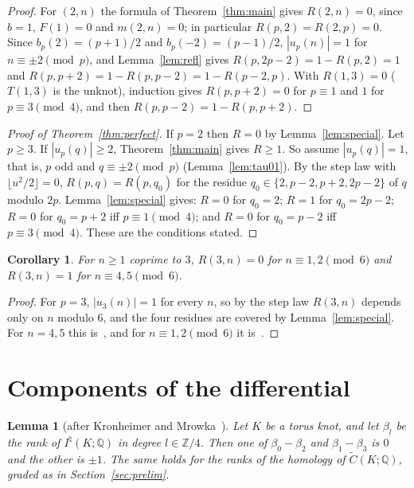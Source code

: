 \documentclass[11pt,reqno]{amsart}
\theoremstyle{plain}
\newtheorem{lemma}[theorem]{Lemma}
\newtheorem{corollary}[theorem]{Corollary}
\theoremstyle{definition}
\newcommand{\Z}{\mathbb{Z}}
\newcommand{\Q}{\mathbb{Q}}
\newcommand{\Inat}{I^{\natural}}
\newcommand{\tC}{\widetilde C}
\begin{document}
\begin{proof}
For $(2,n)$ the formula of Theorem~\ref{thm:main} gives $R(2,n)=0$, since $b=1$, $F(1)=0$ and
$m(2,n)=0$; in particular $R(p,2)=R(2,p)=0$. Since $b_p(2)=(p+1)/2$ and $b_p(-2)=(p-1)/2$,
$|u_p(n)|=1$ for $n\equiv\pm2\pmod p$, and Lemma~\ref{lem:refl} gives $R(p,2p-2)=1-R(p,2)=1$ and
$R(p,p+2)=1-R(p,p-2)=1-R(p-2,p)$. With $R(1,3)=0$ ($T(1,3)$ is the unknot), induction gives
$R(p,p+2)=0$ for $p\equiv1$ and $1$ for $p\equiv3\pmod4$, and then $R(p,p-2)=1-R(p,p+2)$.
\end{proof}

\begin{proof}[Proof of Theorem~\ref{thm:perfect}]
If $p=2$ then $R=0$ by Lemma~\ref{lem:special}. Let $p\ge3$. If $|u_p(q)|\ge2$, Theorem~\ref{thm:main}
gives $R\ge1$. So assume $|u_p(q)|=1$, that is, $p$ odd and $q\equiv\pm2\pmod p$
(Lemma~\ref{lem:tau01}). By the step law with $\lfloor u^2/2\rfloor=0$, $R(p,q)=R(p,q_0)$ for the residue
$q_0\in\{2,p-2,p+2,2p-2\}$ of $q$ modulo $2p$. Lemma~\ref{lem:special} gives:
$R=0$ for $q_0=2$; $R=1$ for $q_0=2p-2$; $R=0$ for $q_0=p+2$ iff $p\equiv1\pmod4$; and $R=0$ for $q_0=p-2$
iff $p\equiv3\pmod4$. These are the conditions stated.
\end{proof}

\begin{corollary}\label{cor:3n}
For $n\ge1$ coprime to $3$, $R(3,n)=0$ for $n\equiv1,2\pmod6$ and $R(3,n)=1$ for $n\equiv4,5\pmod6$.
\end{corollary}

\begin{proof}
For $p=3$, $|u_3(n)|=1$ for every $n$, so by the step law $R(3,n)$ depends only on $n$ modulo $6$, and
the four residues are covered by Lemma~\ref{lem:special}. For $n=4,5$ this
is~\cite[\S\S9.3--9.4]{DSEquiv}, and for $n\equiv1,2\pmod6$ it is~\cite[Prop.~9.37]{DSEquiv}.
\end{proof}

\section{Components of the differential}\label{sec:split}

\begin{lemma}[after Kronheimer and Mrowka~{\cite[\S11]{KMfilt}}]\label{lem:KM}
Let $K$ be a torus knot, and let $\beta_l$ be the rank of $\Inat(K;\Q)$ in degree $l\in\Z/4$. Then one of
$\beta_0-\beta_2$ and $\beta_1-\beta_3$ is $0$ and the other is $\pm1$. The same holds for the ranks of the
homology of $\tC(K;\Q)$, graded as in Section~\ref{sec:prelim}.
\end{lemma}
\end{document}
